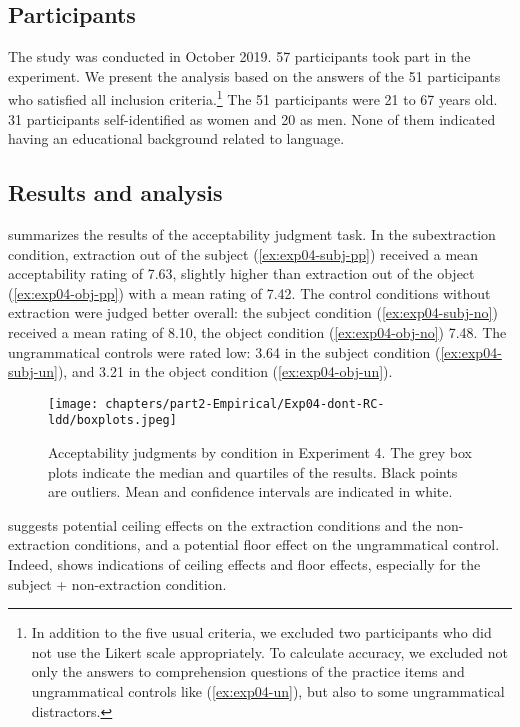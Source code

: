 \subsection{Participants}

The study was conducted in October 2019. 
57 participants took part in the experiment. We present the analysis based on the answers of the 51 participants who satisfied all inclusion criteria.\footnote{In addition to the five usual criteria, we excluded two participants who did not use the Likert scale appropriately. To calculate accuracy, we excluded not only the answers to comprehension questions of the practice items and ungrammatical controls like (\ref{ex:exp04-un}), but also to some ungrammatical distractors.}
The 51 participants were 21 to 67 years old. 31 participants self-identified as women and 20 as men. None of them indicated having an educational background related to language.

\subsection{Results and analysis}

 summarizes the results of the acceptability judgment task. 
In the subextraction condition, extraction out of the subject (\ref{ex:exp04-subj-pp}) received a mean acceptability rating of 7.63, slightly higher than extraction out of the object (\ref{ex:exp04-obj-pp}) with a mean rating of 7.42. The control conditions without extraction were judged better overall: the subject condition (\ref{ex:exp04-subj-no}) received a mean rating  of 8.10, the object condition (\ref{ex:exp04-obj-no}) 7.48. The ungrammatical controls were rated low: 3.64 in the subject condition (\ref{ex:exp04-subj-un}), and 3.21 in the object condition (\ref{ex:exp04-obj-un}).

\begin{figure}
    \centering
    \texttt{[image: chapters/part2-Empirical/Exp04-dont-RC-ldd/boxplots.jpeg]}
    \caption{Acceptability judgments by condition in Experiment 4. The grey box plots indicate the median and quartiles of the results. Black points are outliers. Mean and confidence intervals are indicated in white.}
    \label{fig:exp04-boxplot}
\end{figure}

 suggests potential ceiling effects on the extraction conditions and the non-extraction conditions, and a potential floor effect on the ungrammatical control. Indeed,  shows indications of ceiling effects and floor effects, especially for the subject + non-extraction condition. 

